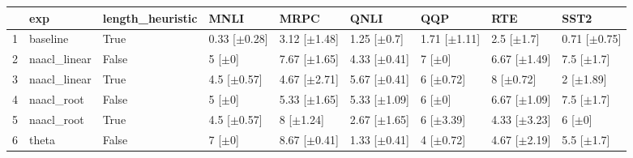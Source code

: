 \begin{table}[ht]
\centering
\begin{tabular}{rllllllll}
  \hline
 & exp & length_heuristic & MNLI & MRPC & QNLI & QQP & RTE & SST2 \\ 
  \hline
1 & baseline & True & 0.33 [$\pm$0.28] & 3.12 [$\pm$1.48] & 1.25 [$\pm$0.7] & 1.71 [$\pm$1.11] & 2.5 [$\pm$1.7] & 0.71 [$\pm$0.75] \\ 
  2 & naacl_linear & False & 5 [$\pm$0] & 7.67 [$\pm$1.65] & 4.33 [$\pm$0.41] & 7 [$\pm$0] & 6.67 [$\pm$1.49] & 7.5 [$\pm$1.7] \\ 
  3 & naacl_linear & True & 4.5 [$\pm$0.57] & 4.67 [$\pm$2.71] & 5.67 [$\pm$0.41] & 6 [$\pm$0.72] & 8 [$\pm$0.72] & 2 [$\pm$1.89] \\ 
  4 & naacl_root & False & 5 [$\pm$0] & 5.33 [$\pm$1.65] & 5.33 [$\pm$1.09] & 6 [$\pm$0] & 6.67 [$\pm$1.09] & 7.5 [$\pm$1.7] \\ 
  5 & naacl_root & True & 4.5 [$\pm$0.57] & 8 [$\pm$1.24] & 2.67 [$\pm$1.65] & 6 [$\pm$3.39] & 4.33 [$\pm$3.23] & 6 [$\pm$0] \\ 
  6 & theta & False & 7 [$\pm$0] & 8.67 [$\pm$0.41] & 1.33 [$\pm$0.41] & 4 [$\pm$0.72] & 4.67 [$\pm$2.19] & 5.5 [$\pm$1.7] \\ 
   \hline
\end{tabular}
\end{table}
